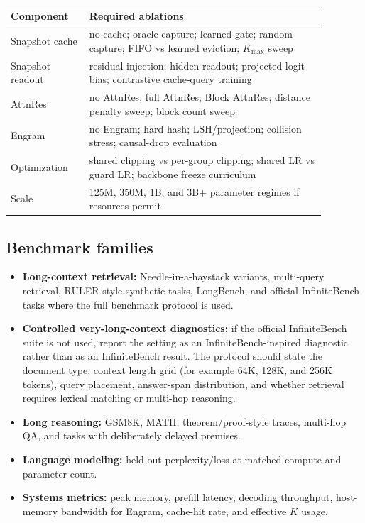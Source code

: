 \documentclass[11pt]{article}
\begin{document}
\begin{center}
\begin{tabular}{p{0.22\linewidth}p{0.66\linewidth}}
\toprule
Component & Required ablations \\
\midrule
Snapshot cache & no cache; oracle capture; learned gate; random capture; FIFO vs learned eviction; $K_{\max}$ sweep \\
Snapshot readout & residual injection; hidden readout; projected logit bias; contrastive cache-query training \\
AttnRes & no AttnRes; full AttnRes; Block AttnRes; distance penalty sweep; block count sweep \\
Engram & no Engram; hard hash; LSH/projection; collision stress; causal-drop evaluation \\
Optimization & shared clipping vs per-group clipping; shared LR vs guard LR; backbone freeze curriculum \\
Scale & 125M, 350M, 1B, and 3B+ parameter regimes if resources permit \\
\bottomrule
\end{tabular}
\end{center}

\subsection{Benchmark families}

\begin{itemize}
    \item \textbf{Long-context retrieval:} Needle-in-a-haystack variants, multi-query retrieval, RULER-style synthetic tasks, LongBench, and official InfiniteBench tasks where the full benchmark protocol is used.
    \item \textbf{Controlled very-long-context diagnostics:} if the official InfiniteBench suite is not used, report the setting as an InfiniteBench-inspired diagnostic rather than as an InfiniteBench result. The protocol should state the document type, context length grid (for example 64K, 128K, and 256K tokens), query placement, answer-span distribution, and whether retrieval requires lexical matching or multi-hop reasoning.
    \item \textbf{Long reasoning:} GSM8K, MATH, theorem/proof-style traces, multi-hop QA, and tasks with deliberately delayed premises.
    \item \textbf{Language modeling:} held-out perplexity/loss at matched compute and parameter count.
    \item \textbf{Systems metrics:} peak memory, prefill latency, decoding throughput, host-memory bandwidth for Engram, cache-hit rate, and effective $K$ usage.
\end{itemize}
\end{document}

